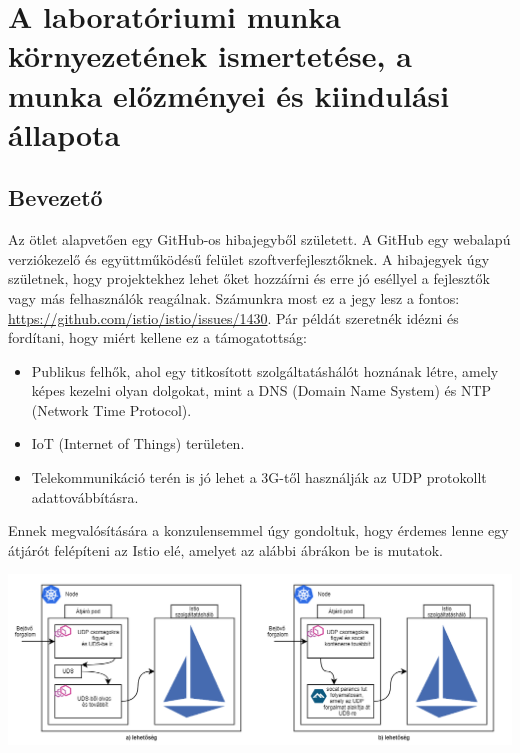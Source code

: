 \documentclass[a4paper,oneside]{article}
\begin{document}
\begin{titlepage}


\end{titlepage}

\section{A laboratóriumi munka környezetének ismertetése,
     a munka előzményei és kiindulási állapota}
\label{sec:kornyezet}
\subsection{Bevezető}
\label{sec:bevezeto}
Az ötlet alapvetően egy GitHub-os hibajegyből született. A GitHub egy
webalapú verziókezelő és együttműködésű felület szoftverfejlesztőknek.
A hibajegyek úgy születnek, hogy projektekhez lehet őket hozzáírni és erre jó
eséllyel a fejlesztők vagy más felhasználók reagálnak. Számunkra most ez a jegy
lesz a fontos: \url{https://github.com/istio/istio/issues/1430}. Pár példát szeretnék
idézni és fordítani, hogy miért kellene ez a támogatottság:
\begin{itemize}
	\item  Publikus felhők, ahol egy titkosított szolgáltatáshálót hoznának létre, amely
	képes kezelni olyan dolgokat, mint a DNS (Domain Name System) és NTP (Network Time Protocol).
	\item IoT (Internet of Things) területen.
	\item Telekommunikáció terén is jó lehet a 3G-től használják az UDP protokollt adattovábbításra.
\end{itemize}
Ennek megvalósítására a konzulensemmel úgy gondoltuk, hogy érdemes lenne
egy átjárót felépíteni az Istio elé, amelyet az alábbi ábrákon be is mutatok.
\begin{center}
\includegraphics[width=\textwidth]{teljes_architektura}
\end{center}
\end{document}
